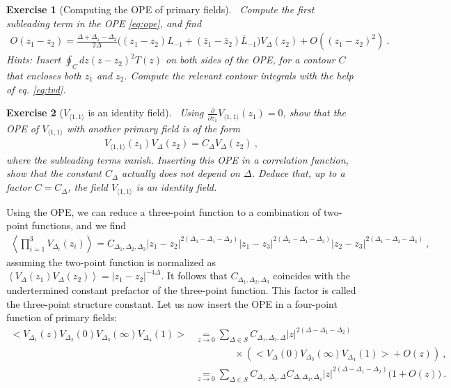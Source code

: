 \documentclass[12pt, a4paper]{article}
\theoremstyle{break}
\newtheorem{exo}{Exercise}[section]
\begin{document}
\begin{exo}[Computing the OPE of primary fields]
~\label{exo:ope}
 Compute the first subleading term in the OPE \eqref{eq:ope}, and find
 \begin{align}
  O(z_1-z_2) = \frac{\Delta+\Delta_1-\Delta_2}{2\Delta} \Big( (z_1-z_2)L_{-1}+(\bar z_1-\bar z_2)\bar L_{-1}\Big) V_{\Delta}(z_2) + O((z_1-z_2)^2)\ .
 \end{align}
Hints: Insert $\oint_C dz(z-z_2)^2 T(z)$ on both sides of the OPE, for a contour $C$ that encloses both $z_1$ and $z_2$. Compute the relevant contour integrals with the help of eq. \eqref{eq:tvd}.
\end{exo}
\begin{exo}[$V_{\langle 1,1\rangle}$ is an identity field]
~\label{exo:id}
Using $\frac{\partial}{\partial z_1} V_{\langle 1,1\rangle}(z_1)=0$, show that the OPE of $V_{\langle 1,1\rangle}$ with another primary field is of the form 
\begin{align}
 V_{\langle 1,1\rangle}(z_1)V_\Delta(z_2) = C_\Delta V_\Delta(z_2)\ ,
\end{align}
where the subleading terms vanish. Inserting this OPE in a correlation function, show that the constant $C_\Delta$ actually does not depend on $\Delta$. Deduce that, up to a factor $C=C_\Delta$, the field $V_{\langle 1,1\rangle}$ is an identity field.
\end{exo}
Using the OPE, we can reduce a three-point function to a combination of two-point functions, and we find 
\begin{align}
 \left<\prod_{i=1}^3 V_{\Delta_i}(z_i) \right> = C_{\Delta_1,\Delta_2,\Delta_3} |z_1-z_2|^{2(\Delta_3-\Delta_1-\Delta_2)} |z_1-z_3|^{2(\Delta_2-\Delta_1-\Delta_3)} |z_2-z_3|^{2(\Delta_1-\Delta_2-\Delta_3)}\ ,
\end{align}
assuming the two-point function is normalized as $\left< V_{\Delta}(z_1)V_{\Delta}(z_2) \right> = |z_1-z_2|^{-4\Delta}$.
It follows that $C_{\Delta_1,\Delta_2,\Delta_3}$ coincides with the undertermined constant prefactor of the three-point function. This factor is called the three-point structure constant.
Let us now insert the OPE in a four-point function of primary fields:
\begin{align}
 \Big<V_{\Delta_1}(z)V_{\Delta_2}(0)V_{\Delta_3}(\infty)V_{\Delta_4}(1)\Big>
 &\underset{z\to 0}{=} \sum_{\Delta\in S} C_{\Delta_1,\Delta_2,\Delta} |z|^{2(\Delta-\Delta_1-\Delta_2)}
 \nonumber
\\ & \qquad \qquad \times 
 \left(\Big< V_\Delta(0)V_{\Delta_3}(\infty)V_{\Delta_4}(1)\Big> + O(z)\right) \ ,
 \\
 &\underset{z\to 0}{=} \sum_{\Delta\in S} C_{\Delta_1,\Delta_2,\Delta} C_{\Delta,\Delta_3,\Delta_4}
|z|^{2(\Delta-\Delta_1-\Delta_2)} \Big(1 +O(z) \Big)\ .
\end{align}
\end{document}
